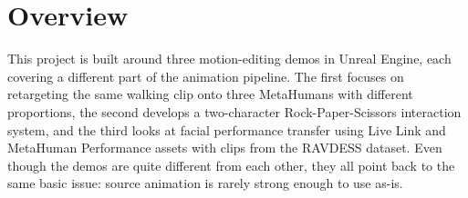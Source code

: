 \section*{Overview}

This project is built around three motion-editing demos in Unreal Engine, each covering a different part of the animation pipeline. The first focuses on retargeting the same walking clip onto three MetaHumans with different proportions, the second develops a two-character Rock-Paper-Scissors interaction system, and the third looks at facial performance transfer using Live Link and MetaHuman Performance assets with clips from the RAVDESS dataset. Even though the demos are quite different from each other, they all point back to the same basic issue: source animation is rarely strong enough to use as-is.
